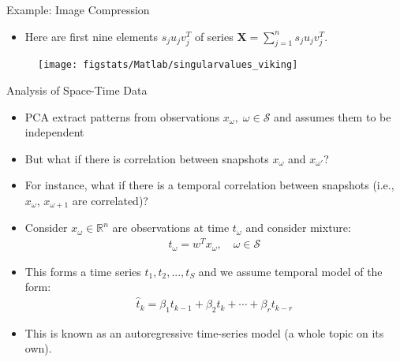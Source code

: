 \documentclass[9pt]{beamer}
\begin{document}
\begin{frame}{Example: Image Compression}

\begin{itemize}
\item Here are first nine elements $s_ju_jv_j^T$ of series $\mathbf{X}=\sum_{j=1}^ns_ju_jv_j^T$. 
\end{itemize}

\begin{figure}[!htb]
    \centering
	\texttt{[image: figstats/Matlab/singularvalues\_viking]}
\end{figure}


\end{frame}

%
\begin{frame}{Analysis of Space-Time Data}

\begin{block}{}
\begin{itemize}
\item PCA extract patterns from observations $x_\omega,\; \omega \in \mathcal{S}$ and assumes them to be independent
\item But what if there is correlation between snapshots $x_\omega$ and $x_{\omega'}$?
\item For instance, what if there is a temporal correlation between snapshots (i.e., $x_\omega$, $x_{\omega+1}$ are correlated)? 
\end{itemize}
\end{block}

\begin{itemize}
\item Consider $x_\omega\in \mathbb{R}^n$ are observations at time $t_\omega$ and consider mixture:
\begin{align*}
t_\omega=w^Tx_\omega,\quad \omega \in \mathcal{S}
\end{align*}
\item This forms a time series $t_1,t_2,...,t_S$ and we assume temporal model of the form:
\begin{align*}
\hat{t}_k=\beta_1t_{k-1}+\beta_2t_{k}+\cdots+\beta_rt_{k-r}
\end{align*}
\item This is known as an autoregressive time-series model (a whole topic on its own).
\end{itemize}


\end{frame}
\end{document}
